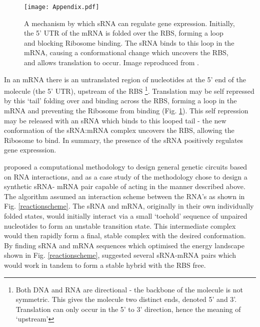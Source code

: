 \documentclass[10pt,journal]{./IEEE_latex_class/IEEEtran}
\begin{document}
\begin{figure}[H]
\centering
\texttt{[image: Appendix.pdf]}
\caption{A mechanism by which sRNA can regulate gene expression. Initially, the 5' UTR of the mRNA is folded over the RBS, forming a loop and blocking Ribosome binding. The sRNA binds to this loop in the mRNA, causing a conformational change which uncovers the RBS, and allows translation to occur. Image reproduced from \cite{Rodrigo2012}.}
\label{RBS}
\end{figure}
\setcounter{figure}{2}

In an mRNA there is an untranslated region of nucleotides at the 5' end of the molecule (the 5' UTR), upstream of the RBS \footnote{Both DNA and RNA are directional - the backbone of the molecule is not symmetric. This gives the molecule two distinct ends, denoted 5' and 3'. Translation can only occur in the 5' to 3' direction, hence the meaning of `upstream'}. Translation may be self repressed by this `tail' folding over and binding across the RBS, forming a  loop in the mRNA and preventing the Ribosome from binding (Fig. \ref{RBS}). This self repression may be released with an sRNA which binds to this looped tail - the new conformation of the sRNA:mRNA complex uncovers the RBS, allowing the Ribosome to bind. In summary, the presence of the sRNA positively regulates gene expresssion.


\cite{Rodrigo2012} proposed a computational methodology to design general genetic circuits based on RNA interactions, and as a case study of the methodology chose to design a synthetic sRNA- mRNA pair capable of acting in the manner described above. The algorithm assumed an interaction scheme between the RNA's as shown in Fig. \ref{reactionscheme}. The sRNA and mRNA, originally in their own individually folded states, would initially interact via a small 
`toehold' sequence of unpaired nucleotides to form an unstable transition state. This intermediate complex would then rapidly form a final, stable complex with the desired conformation. By finding sRNA and mRNA sequences which optimised the energy landscape shown in Fig. \ref{reactionscheme}, \cite{Rodrigo2012} suggested several sRNA-mRNA pairs which would work in tandem to form a stable hybrid with the RBS free. 
\end{document}
